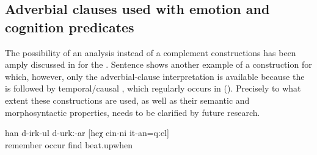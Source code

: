 \subsection{Adverbial clauses used with emotion and cognition predicates}
\label{ssec:Adverbial clauses used with emotion and cognition predicates}
The possibility of an analysis  instead of a complement constructions has been amply discussed in  for the . Sentence  shows another example of a construction for which, however, only the adverbial-clause interpretation is available because the  is followed by temporal/causal   , which regularly occurs in  (). Precisely to what extent these constructions are used, as well as their semantic and morphosyntactic properties, needs to be clarified by future research.


\begin{exe}
	\ex	\label{ex:‎He is probably remembering when he was beaten}
	\gll	han	d-irk-ul	d-urkː-ar	[heχ	cin-ni	it-an=qːel]\\
		remember	occur	find			beat.upwhen\\
	\glt	{}
\end{exe}
